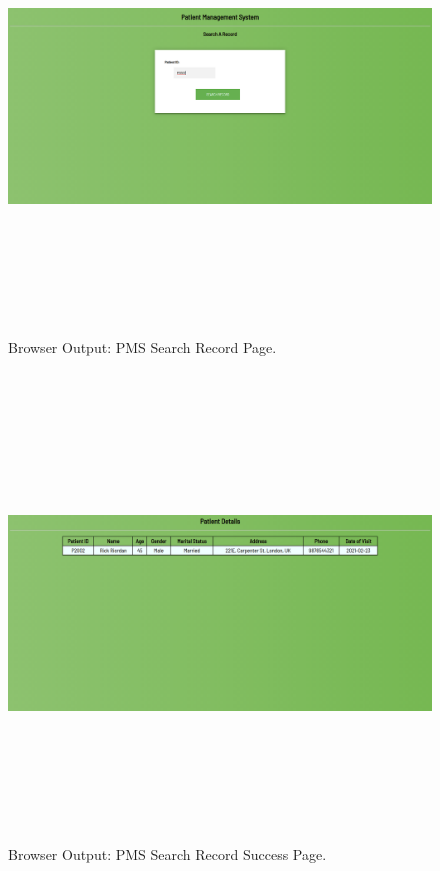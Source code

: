 \documentclass[12pt, a4]{article}
\begin{document}
\newpage
\subsection*{}
\begin{figure}[h]
\centering
\caption{Browser Output: PMS Search Record Page.}
\includegraphics[height=12cm, width=16cm]{Output/PMSSearch.png}
\end{figure}

\newpage
\subsection*{}
\begin{figure}[h]
\centering
\caption{Browser Output: PMS Search Record Success Page.}
\includegraphics[height=12cm, width=16cm]{Output/PMSSearchDone.png}
\end{figure}
\end{document}
